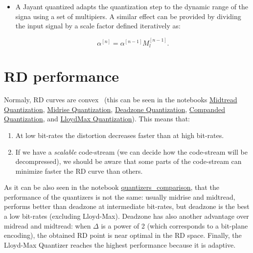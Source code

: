 \begin{itemize}
\item
  A Jayant quantized adapts the quantization step to the dynamic range
  of the signa using a set of multipiers. A similar effect can be
  provided by dividing the input signal by a scale factor defined
  iteratively as:

  \begin{equation}
    \alpha^{[n]} = \alpha^{[n-1]}M_l^{[n-1]}.
  \end{equation}
\end{itemize}


\section{RD performance}

Normaly, RD curves are convex~\cite{vruiz__information_theory} (this
can be seen in the notebooks
\href{https://github.com/Sistemas-Multimedia/Sistemas-Multimedia.github.io/blob/master/contents/scalar_quantization/midtread.ipynb}{Midtread Quantization},
\href{https://github.com/Sistemas-Multimedia/Sistemas-Multimedia.github.io/blob/master/contents/scalar_quantization/midrise.ipynb}{Midrise Quantization},
\href{https://github.com/Sistemas-Multimedia/Sistemas-Multimedia.github.io/blob/master/contents/scalar_quantization/deadzone.ipynb}{Deadzone Quantization},
\href{https://github.com/Sistemas-Multimedia/Sistemas-Multimedia.github.io/blob/master/contents/scalar_quantization/companded.ipynb}{Companded Quantization},
and
\href{https://github.com/Sistemas-Multimedia/Sistemas-Multimedia.github.io/blob/master/contents/scalar_quantization/LloydMax.ipynb}{LloydMax Quantization}). This means that:
\begin{enumerate}
\item At low bit-rates the distortion decreases faster than at high
  bit-rates.
\item If we have a \emph{scalable} code-stream (we can decide how the
  code-stream will be decompressed), we should be aware that some
  parts of the code-stream can minimize faster the RD curve than
  others.
\end{enumerate}

As it can be also seen in the notebook
\href{https://github.com/Sistemas-Multimedia/Sistemas-Multimedia.github.io/blob/master/contents/scalar_quantization/compare_quantizers.ipynb}{quantizers\_comparison},
that the performance of the quantizers is not the same: usually
midrise and midtread, performs better than deadzone at intermediate
bit-rates, but deadzone is the best a low bit-rates (excluding
Lloyd-Max). Deadzone has also another advantage over midread and
midtread: when $\Delta$ is a power of 2 (which corresponds to a
bit-plane encoding), the obtained RD point is near optimal in the RD
space. Finally, the Lloyd-Max Quantizer reaches the highest
performance because it is adaptive.

